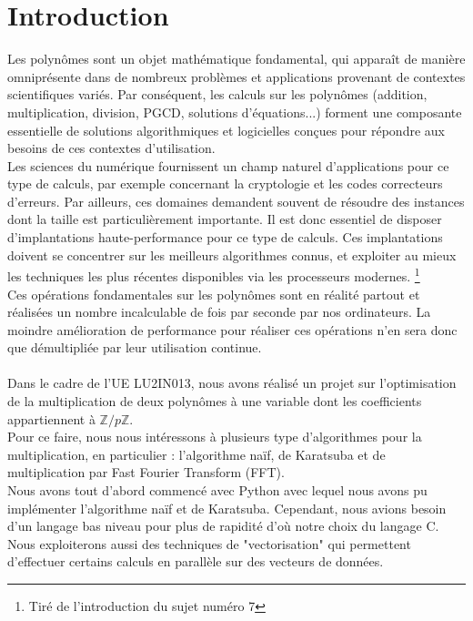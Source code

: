 \documentclass[12pt, a4paper]{article}
\begin{document}
\tableofcontents
\newpage

\section*{Introduction}

Les polynômes sont un objet mathématique fondamental, qui apparaît de manière omniprésente dans de nombreux problèmes et applications provenant de contextes scientifiques variés. Par conséquent, les calculs sur les polynômes (addition, multiplication, division, PGCD, solutions d’équations...) forment une composante essentielle de solutions algorithmiques et logicielles conçues pour répondre aux besoins de ces contextes d’utilisation. \\
\indent Les sciences du numérique fournissent un champ naturel d’applications pour ce type de calculs, par exemple concernant la cryptologie et les codes correcteurs d’erreurs. Par ailleurs, ces domaines demandent souvent de résoudre des instances dont la taille est particulièrement importante. Il est donc essentiel de disposer d’implantations haute-performance pour ce type de calculs. Ces implantations doivent se concentrer sur les meilleurs algorithmes connus, et exploiter au mieux les techniques les plus récentes disponibles via les processeurs modernes. \footnote{Tiré de l'introduction du sujet numéro 7} \\
\indent Ces opérations fondamentales sur les polynômes sont en réalité partout et réalisées un nombre incalculable de fois par seconde par nos ordinateurs. La moindre amélioration de performance pour réaliser ces opérations n'en sera donc que démultipliée par leur utilisation continue. \\
\ \\
\indent Dans le cadre de l'UE LU2IN013, nous avons réalisé un projet sur l'optimisation de la multiplication de deux polynômes à une variable dont les coefficients appartiennent à $\mathbb{Z}/p\mathbb{Z}$. \\
\indent Pour ce faire, nous nous intéressons à plusieurs type d'algorithmes pour la multiplication, en particulier : l'algorithme naïf, de Karatsuba et de multiplication par Fast Fourier Transform (FFT).\\
\indent Nous avons tout d'abord commencé avec Python avec lequel nous avons pu implémenter l'algorithme naïf et de Karatsuba. Cependant,  nous avions besoin d'un langage bas niveau pour plus de rapidité d'où notre choix du langage C. \\
\indent Nous exploiterons aussi des techniques de "vectorisation" qui permettent d’effectuer certains calculs en parallèle sur des vecteurs de données.
\end{document}
